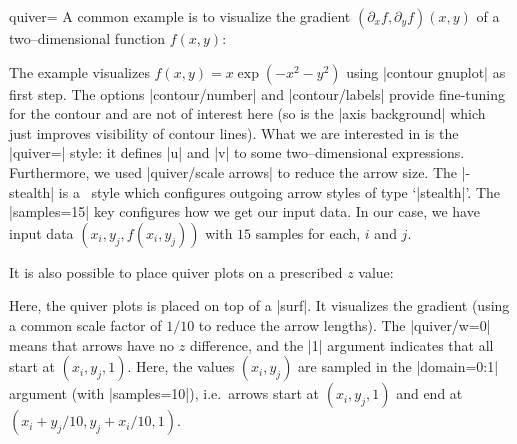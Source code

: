 {\begin{plottype}[/pgfplots]{quiver=\textcolor{black}{}}
	A common example is to visualize the gradient $(\partial_x f,\partial_y f)(x,y)$ of a two--dimensional function $f(x,y)$:
\pgfplotsexpensiveexample
\begin{codeexample}[]
\end{codeexample}
	\noindent The example visualizes $f(x,y) = x\exp(-x^2-y^2)$ using |contour gnuplot| as first step. The options |contour/number| and |contour/labels| provide fine-tuning for the contour and are not of interest here (so is the |axis background| which just improves visibility of contour lines). What we are interested in is the |quiver=| style: it defines |u| and |v| to some two--dimensional expressions. Furthermore, we used |quiver/scale arrows| to reduce the arrow size. The |-stealth| is a \Tikz\ style which configures outgoing arrow styles of type `|stealth|'. The |samples=15| key configures how we get our input data. In our case, we have input data $(x_i,y_j,f(x_i,y_j))$ with $15$ samples for each, $i$ and $j$.

	It is also possible to place quiver plots on a prescribed $z$ value:
\pgfplotsexpensiveexample
\begin{codeexample}[]
\end{codeexample}
	\noindent Here, the quiver plots is placed on top of a |surf|. It visualizes the gradient (using a common scale factor of $1/10$ to reduce the arrow lengths). The |quiver/w=0| means that arrows have no $z$ difference, and the |{1}| argument indicates that all start at $(x_i,y_j,1)$. Here, the values $(x_i,y_j)$ are sampled in the |domain=0:1| argument (with |samples=10|), i.e.\ arrows start at $(x_i,y_j,1)$ and end at $(x_i+y_j/10, y_j+x_i/10, 1)$.


\end{plottype}}
